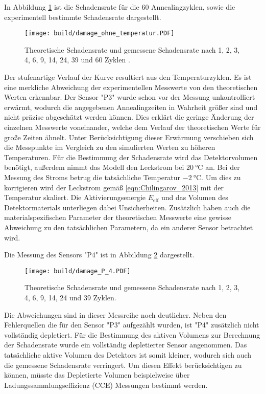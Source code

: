 In Abbildung \ref{fig:P_3} ist die Schadensrate für die 60 Annealingzyklen,
sowie die experimentell bestimmte Schadensrate dargestellt.

\begin{figure}
  \centering
    \texttt{[image: build/damage\_ohne\_temperatur.PDF]}
\caption{Theoretische Schadensrate und gemessene Schadensrate nach 1, 2, 3, 4, 6, 9, 14, 24, 39 und 60 Zyklen .}
\label{fig:P_3}
\end{figure}

Der stufenartige Verlauf der Kurve resultiert aus den Temperaturzyklen.
Es ist eine merkliche Abweichung der experimentellen Messwerte von den theoretischen
Werten erkennbar. Der Sensor "P3" wurde schon vor der Messung unkontrolliert erwärmt, wodurch
die angegebenen Annealingzeiten in Wahrheit größer sind und nicht präzise abgeschätzt werden können. Dies erklärt die
geringe Änderung der einzelnen Messwerte voneinander, welche dem
Verlauf der theoretischen Werte für große Zeiten ähnelt.
Unter Berücksichtigung dieser Erwärmung verschieben sich die Messpunkte im Vergleich zu den
simulierten Werten zu höheren Temperaturen.
Für die Bestimmung der Schadensrate
wird das Detektorvolumen benötigt, außerdem nimmt das Modell den Leckstrom bei $\SI{20}{\celsius}$ an.
Bei der Messung des Stroms betrug die tatsächliche Temperatur
$\SI{-2}{\celsius}$. Um dies zu korrigieren wird der Leckstrom gemäß \ref{eqn:Chilingarov_2013}
mit der Temperatur skaliert. Die Aktivierungsenergie $E_{\mathrm{eff}}$ und das Volumen des Detektormaterials
unterliegen dabei Unsicherheiten. Zusätzlich haben auch die materialspezifischen Parameter
der theoretischen Messwerte eine gewisse Abweichung zu den tatsächlichen Parametern, da
ein anderer Sensor betrachtet wird.

Die Messung des Sensors "P4" ist in Abbildung \ref{fig:P_4}
dargestellt.

\begin{figure}
  \centering
    \texttt{[image: build/damage\_P\_4.PDF]}
\caption{Theoretische Schadensrate und gemessene Schadensrate nach 1, 2, 3, 4, 6, 9, 14, 24 und 39 Zyklen.}
\label{fig:P_4}
\end{figure}

Die Abweichungen sind in dieser Messreihe noch deutlicher. Neben den Fehlerquellen die
für den Sensor "P3" aufgezählt wurden, ist "P4" zusätzlich nicht vollständig depletiert.
Für die Bestimmung des aktiven Volumens zur Berechnung der Schadensrate wurde ein vollständig
depletierter Sensor angenommen. Das tatsächliche aktive Volumen des Detektors ist somit kleiner, wodurch sich auch
die gemessene Schadensrate verringert.
Um diesen Effekt berücksichtigen zu können, müsste das Depletierte Volumen
beispielweise über Ladungssammlungseffizienz (CCE) Messungen bestimmt werden.
